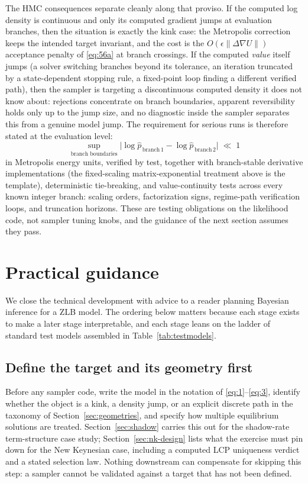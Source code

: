 \documentclass[11pt]{article}
\begin{document}
The HMC consequences separate cleanly along that proviso. If the computed log
density is continuous and only its computed gradient jumps at evaluation
branches, then the situation is exactly the kink case: the Metropolis
correction keeps the intended target invariant, and the cost is the
$O(\epsilon\|\Delta\nabla U\|)$ acceptance penalty of \eqref{eq:56a} at branch
crossings. If the computed \emph{value} itself jumps (a solver switching
branches beyond its tolerance, an iteration truncated by a state-dependent
stopping rule, a fixed-point loop finding a different verified path), then
the sampler is targeting a discontinuous computed density it does not know
about: rejections concentrate on branch boundaries, apparent reversibility
holds only up to the jump size, and no diagnostic inside the sampler
separates this from a genuine model jump. The requirement for serious runs is
therefore stated at the evaluation level:
\begin{equation}\label{eq:98}
 \sup_{\text{branch boundaries}}
 \bigl|\log\widehat p_{\,\text{branch}\,1}-\log\widehat p_{\,\text{branch}\,2}\bigr|
 \;\ll\;1
\end{equation}
in Metropolis energy units, verified by test, together with branch-stable
derivative implementations (the fixed-scaling matrix-exponential treatment
above is the template), deterministic tie-breaking, and value-continuity tests
across every known integer branch: scaling orders, factorization signs,
regime-path verification loops, and truncation horizons. These are testing
obligations on the likelihood code, not sampler tuning knobs, and the guidance
of the next section assumes they pass.

\section{Practical guidance}
\label{sec:guidance}

We close the technical development with advice to a reader planning Bayesian
inference for a ZLB model. The ordering below matters because each
stage exists to make a later stage interpretable, and each stage leans on
the ladder of standard test models assembled in
Table~\ref{tab:testmodels}.

\subsection*{Define the target and its geometry first}

Before any sampler code, write the model in the notation of
\eqref{eq:1}--\eqref{eq:3}, identify whether the object is a kink, a density
jump, or an explicit discrete path in the taxonomy of Section~\ref{sec:geometries},
and specify how multiple equilibrium solutions are treated.
Section~\ref{sec:shadow} carries this out for the shadow-rate term-structure case
study; Section~\ref{sec:nk-design} lists what the exercise must pin down for the New
Keynesian case, including a computed LCP uniqueness verdict and a stated
selection law. Nothing downstream can compensate for skipping this step: a
sampler cannot be validated against a target that has not been defined.
\end{document}
